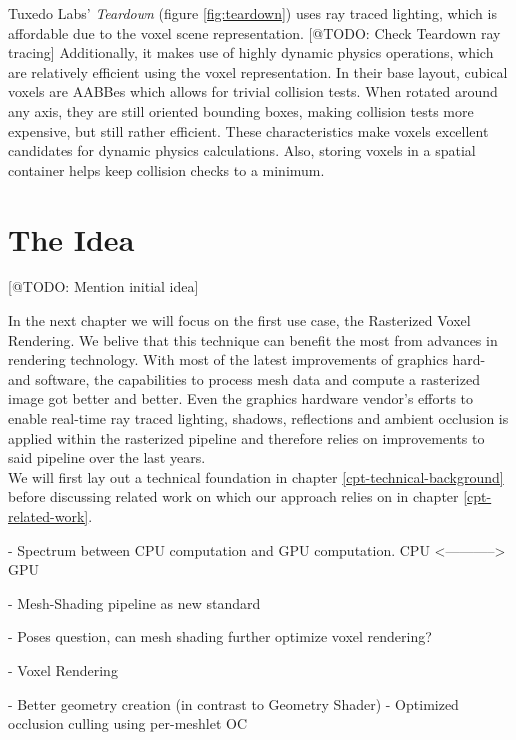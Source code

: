Tuxedo Labs' \emph{Teardown} (figure \ref{fig:teardown}) uses ray traced lighting, which is affordable due 
to the voxel scene representation. [@TODO: Check Teardown ray tracing]
Additionally, it makes use of highly dynamic physics operations, which are relatively efficient using the voxel 
representation. In their base layout, cubical voxels are \ac{AABB}es which allows for trivial collision tests.
When rotated around any axis, they are still oriented bounding boxes, making collision tests more expensive,
but still rather efficient. These characteristics make voxels excellent candidates for dynamic physics 
calculations. Also, storing voxels in a spatial container helps keep collision checks to a minimum. \\

\section{The Idea}

[@TODO: Mention initial idea]

\noindent
In the next chapter we will focus on the first use case, the Rasterized Voxel Rendering. We belive that this 
technique can benefit the most from advances in rendering technology.
With most of the latest improvements of graphics hard- and software, the capabilities to process mesh data 
and compute a rasterized image got better and better. Even the graphics hardware vendor's efforts to enable 
real-time ray traced lighting, shadows, reflections and ambient occlusion is applied within the rasterized 
pipeline and therefore relies on improvements to said pipeline over the last years. \\
We will first lay out a technical foundation in chapter \ref{cpt-technical-background} before discussing 
related work on which our approach relies on in chapter \ref{cpt-related-work}.



- Spectrum between CPU computation and GPU computation. 
CPU <-----------> GPU

- Mesh-Shading pipeline as new standard 

- Poses question, can mesh shading further optimize voxel rendering?

- Voxel Rendering

- Better geometry creation (in contrast to Geometry Shader)
- Optimized occlusion culling using per-meshlet OC
